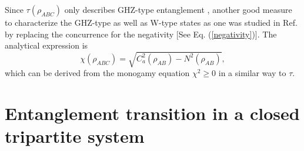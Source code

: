 Since $\tau\left(\rho_{ABC}\right)$ only describes GHZ-type entanglement \cite{greenberger1990bell}, another good measure to characterize the GHZ-type as well as W-type states as one was studied in Ref. \cite{yu2009monogamy} by replacing the concurrence for the negativity [See Eq. (\ref{negativity})]. The analytical expression is 
\begin{equation}\label{chi}
\chi\left(\rho_{ABC}\right)=\sqrt{C_{a}^{2}\left(\rho_{AB}\right)-N^{2}\left(\rho_{AB}\right)},
\end{equation}
which can be derived from the monogamy equation $\chi^2 \geq 0$ in a similar way to $\tau$.

 

























\section{\label{sec:formalism2}Entanglement transition in a closed tripartite system}


